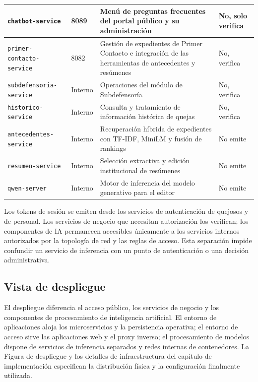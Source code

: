\begin{longtable}{|p{3.4cm}|p{1.2cm}|p{6.6cm}|p{2.4cm}|}
		\texttt{chatbot-\allowbreak service} & 8089 & Menú de preguntas frecuentes del portal público y su
		administración & No, solo verifica \\ \hline
		\texttt{primer-contacto-service} & 8082 & Gestión de expedientes de Primer Contacto e integración
		de las herramientas de antecedentes y resúmenes & No, verifica \\ \hline
		\texttt{subdefensoria-service} & Interno & Operaciones del módulo de Subdefensoría & No, verifica \\ \hline
		\texttt{historico-service} & Interno & Consulta y tratamiento de información histórica
		de quejas & No, verifica \\ \hline
		\texttt{antecedentes-service} & Interno & Recuperación híbrida de expedientes con TF-IDF,
		MiniLM y fusión de rankings & No emite \\ \hline
		\texttt{resumen-service} & Interno & Selección extractiva y edición institucional de resúmenes &
		No emite \\ \hline
		\texttt{qwen-server} & Interno & Motor de inferencia del modelo generativo para el editor &
		No emite \\ \hline
	\end{longtable}
	
	\normalsize
	
	Los tokens de sesión se emiten desde los servicios de autenticación de quejosos y de
	personal. Los servicios de negocio que necesitan autorización los verifican; los componentes
	de IA permanecen accesibles únicamente a los servicios internos autorizados por la topología
	de red y las reglas de acceso. Esta separación impide confundir un servicio de inferencia
	con un punto de autenticación o una decisión administrativa.
	
	\subsection{Vista de despliegue}
	El despliegue diferencia el acceso público, los servicios de negocio y los componentes
	de procesamiento de inteligencia artificial. El entorno de aplicaciones aloja los
	microservicios y la persistencia operativa; el entorno de acceso sirve las aplicaciones
	web y el proxy inverso; el procesamiento de modelos dispone de servicios de inferencia
	separados y redes internas de contenedores. La Figura de despliegue y los detalles de
	infraestructura del capítulo de implementación especifican la distribución física y la
	configuración finalmente utilizada.
	
